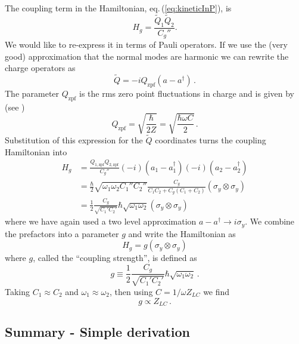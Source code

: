 The coupling term in the Hamiltonian, eq.\,(\ref{eq:kineticInP}), is \begin{equation}
H_g = \frac{ \tilde{Q}_1 \tilde{Q}_2} {C_g''}. \label{eq:sec:coupling:H_g} \end{equation}
We would like to re-express it in terms of Pauli operators.
If we use the (very good) approximation that the normal modes are harmonic we can rewrite the charge operators as \begin{equation}
\tilde{Q} = -i Q_{\textrm{zpf}} (a - a^{\dagger}) \, . \end{equation}
The parameter $Q_{\textrm{zpf}}$ is the rms zero point fluctuations in charge and is given by (see \citeinternaltype {}) \begin{equation}
Q_{\textrm{zpf}} = \sqrt{\frac{\hbar}{2Z}} = \sqrt{\frac{\hbar \omega C}{2}} \, . \end{equation}
Substitution of this expression for the $\tilde{Q}$ coordinates turns the coupling Hamiltonian into
\begin{align}
H_g &= \frac{Q_{1,\textrm{zpf}}Q_{2,\textrm{zpf}}}{C_g''}(-i)(a_1-a_1^{\dagger})(-i)(a_2-a_2^{\dagger}) \nonumber \\
&= \frac{\hbar}{2}\sqrt{\omega_1\omega_2 C_1'' C_2''}\frac{C_g}{C_1C_2 + C_g(C_1+C_2)}(\sigma_y \otimes \sigma_y) \nonumber \\
&= \frac{1}{2}\frac{C_g}{\sqrt{C_1' C_2'}} \hbar\sqrt{\omega_1\omega_2} (\sigma_y \otimes \sigma_y) \nonumber
\end{align}
where we have again used a two level approximation \mbox{$a - a^\dagger \rightarrow i \sigma_y$}.
We combine the prefactors into a parameter $g$ and write the Hamiltonian as \begin{equation}
H_g = g \left( \sigma_y \otimes \sigma_y \right) \end{equation}
where $g$, called the ``coupling strength'', is defined as \begin{equation}
g \equiv \frac{1}{2} \frac{C_g}{\sqrt{C_1' C_2'}} \hbar\sqrt{\omega_1\omega_2} \, . \end{equation}
Taking $C_1 \approx C_2$ and $\omega_1 \approx \omega_2$, then using $C = 1 / \omega Z_{LC}$ we find
\begin{equation}
g \propto Z_{LC} \, .
\end{equation}

\subsection{Summary - Simple derivation}

